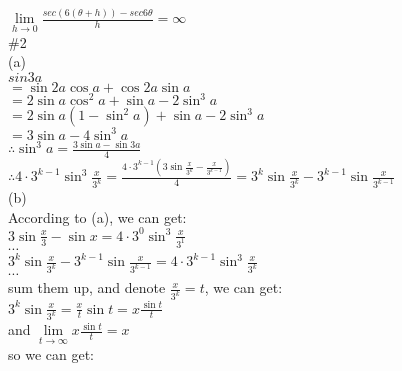 \documentclass{article}
\begin{document}
$\lim \limits_{h \to 0}\displaystyle\frac{sec(6(\theta+h))-sec6\theta}{h}=\infty$\\

\textcolor[rgb]{0.00,0.00,0.50}{\#2}\\

(a)\\

\quad$sin3a$\\

$=\sin 2a\cos a+\cos 2a\sin a$\\

$=2\sin a\cos^2 a+\sin a-2\sin^3 a$\\

$=2\sin a(1-\sin^2 a)+\sin a-2\sin^3 a$\\

$=3\sin a-4\sin^3 a$\\

$\therefore$\qquad$\sin^3 a=\displaystyle\frac{3\sin a-\sin 3a}{4}$\\

$\therefore$\qquad$4\cdot3^{k-1}\sin^3\displaystyle\frac{x}{3^k}=\frac{4\cdot3^{k-1}\left(3\sin \frac{x}{3^k}-\frac{x}{3^{k-1}}\right)}{4}=3^k\sin\frac{x}{3^k}-3^{k-1}\sin \frac{x}{3^{k-1}}$\\

(b)\\

According to (a), we can get:\\

$3\sin \displaystyle\frac{x}{3}-\sin x=4\cdot3^0\sin^3\frac{x}{3^1}$\\

$\cdots$\\

$\displaystyle3^k\sin \frac{x}{3^k}-3^{k-1}\sin \frac{x}{3^{k-1}}=4\cdot3^{k-1}\sin^3\frac{x}{3^k}$\\

$\cdots$\\

sum them up, and denote $\displaystyle\frac{x}{3^k}=t$, we can get:\\

$\displaystyle3^k\sin\frac{x}{3^k}=\frac{x}{t}\sin t=x\frac{\sin t}{t}$\\

and $\lim \limits_{t \to \infty}x\frac{\sin t}{t}=x$\\

so we can get:\\
\end{document}
